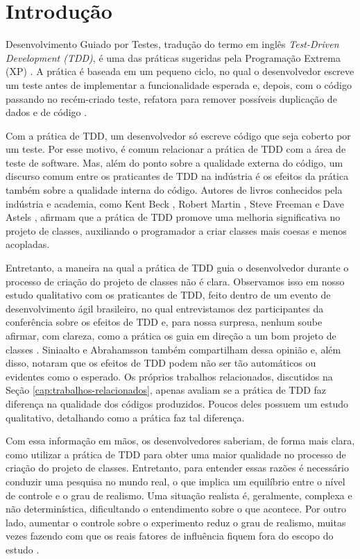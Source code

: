\chapter{Introdução}
\label{cap:introducao}

Desenvolvimento Guiado por Testes, tradução do termo
em inglês \textit{Test-Driven Development (TDD)},
é uma das práticas sugeridas pela Programação
Extrema (XP) \cite{XPExplained}. A prática é baseada em um pequeno ciclo, 
no qual o desenvolvedor escreve um teste antes
de implementar a funcionalidade esperada e, depois, com o código
passando no recém-criado teste, refatora para 
remover possíveis duplicação de dados e de código \cite{TDDByExample}.

Com a prática de TDD, um desenvolvedor só escreve código
que seja coberto por um teste. Por esse motivo, é comum relacionar a prática
de TDD com a área de teste de software. Mas, além do ponto sobre
a qualidade externa do código, um discurso comum entre os praticantes de TDD
na indústria é os efeitos da prática também sobre a qualidade interna do código.
Autores de livros conhecidos pela indústria e academia, como
Kent Beck \cite{TDDByExample}, Robert Martin \cite{agile-ppp}, 
Steve Freeman \cite{GOOS} e Dave Astels \cite{astels-tdd}, afirmam que a prática de TDD
promove uma melhoria significativa no projeto de classes, auxiliando
o programador a criar classes mais coesas e menos acopladas.

Entretanto, a maneira na qual a prática de TDD guia o desenvolvedor
durante o processo de criação do projeto de classes não é clara. Observamos
isso em nosso estudo qualitativo com os praticantes de TDD, feito dentro de um
evento de desenvolvimento ágil brasileiro, no qual entrevistamos dez
participantes da conferência sobre os efeitos de TDD e, para nossa surpresa,
nenhum soube afirmar, com clareza, como a prática os guia em direção
a um bom projeto de classes \cite{aniche-wbma}.
Siniaalto e Abrahamsson \cite{alarming-results} também
compartilham dessa opinião e, além disso, notaram que os efeitos de TDD podem 
não ser tão automáticos ou evidentes como o esperado.
Os próprios trabalhos relacionados, discutidos na Seção \ref{cap:trabalhos-relacionados},
apenas avaliam se a prática de TDD faz diferença na qualidade dos códigos produzidos.
Poucos deles possuem um estudo qualitativo, detalhando como a prática
faz tal diferença.

Com essa informação em mãos, os desenvolvedores saberiam, de forma mais clara,
como utilizar a prática de TDD para obter uma maior qualidade no processo de criação
do projeto de classes. Entretanto, para entender essas razões é necessário
conduzir uma pesquisa no mundo real, o que  
implica um equilíbrio entre o nível de controle
e o grau de realismo. Uma situação realista é, geralmente, complexa e 
não determinística, dificultando o entendimento sobre o que acontece. Por outro
lado, aumentar o controle sobre o experimento reduz o grau de realismo, muitas
vezes fazendo com que os reais fatores de influência fiquem fora do escopo do 
estudo \cite{guidelines-case-study}.


